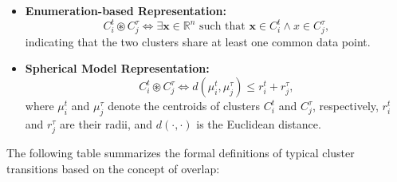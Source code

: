 \begin{itemize}
    \item \textbf{Enumeration-based Representation:}
          \begin{equation}
              C_i^t \circledast C_j^\tau \iff \exists \mathbf{x} \in \mathbb{R}^n \text{ such that } \mathbf{x} \in C_i^t \land x \in C_j^\tau,
          \end{equation}
          indicating that the two clusters share at least one common data point.

    \item \textbf{Spherical Model Representation:}
          \begin{equation}
              C_i^t \circledast C_j^\tau \iff d(\mu_i^t, \mu_j^\tau) \leq r_i^t + r_j^\tau,
          \end{equation}
          where $ \mu_i^t $ and $ \mu_j^\tau $ denote the centroids of
          clusters $ C_i^t $ and $ C_j^\tau $, respectively, $ r_i^t $ and $ r_j^\tau $
          are their radii, and $ d(\cdot, \cdot) $ is the Euclidean distance.
\end{itemize}

The following table summarizes the formal definitions of typical cluster
transitions based on the concept of overlap:

